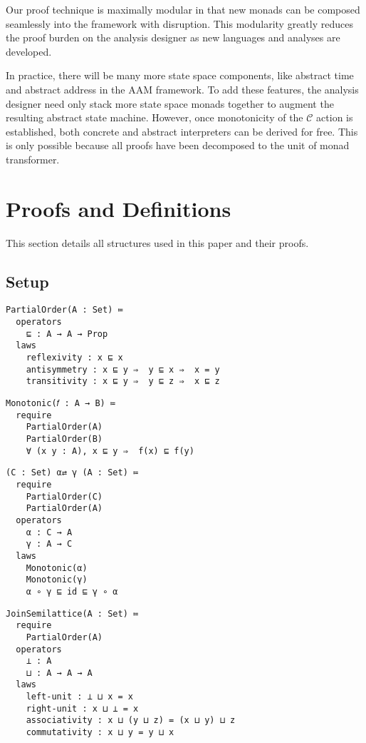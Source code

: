\documentclass{article}
\begin{document}
Our proof technique is maximally modular in that new monads can be composed seamlessly into the framework with disruption.
This modularity greatly reduces the proof burden on the analysis designer as new languages and analyses are developed.

In practice, there will be many more state space components, like abstract time and abstract address in the AAM framework.
To add these features, the analysis designer need only stack more state space monads together to augment the resulting abstract state machine.
However, once monotonicity of the $𝒞$ action is established, both concrete and abstract interpreters can be derived for free.
This is only possible because all proofs have been decomposed to the unit of monad transformer.



\section{Proofs and Definitions}
\label{section:Proofs+Definitions}

This section details all structures used in this paper and their proofs.


\subsection{Setup}
\label{section:Proofs+Definitions:Setup}

\begin{verbatim}
PartialOrder(A : Set) ≔
  operators
    ⊑ : A → A → Prop
  laws
    reflexivity : x ⊑ x
    antisymmetry : x ⊑ y ⇒  y ⊑ x ⇒  x = y
    transitivity : x ⊑ y ⇒  y ⊑ z ⇒  x ⊑ z
\end{verbatim}

\begin{verbatim}
Monotonic(𝑓 : A → B) ≔ 
  require
    PartialOrder(A)
    PartialOrder(B)
    ∀ (x y : A), x ⊑ y ⇒  f(x) ⊑ f(y)
\end{verbatim}

\begin{verbatim}
(C : Set) α⇄ γ (A : Set) ≔
  require
    PartialOrder(C)
    PartialOrder(A)
  operators
    α : C → A
    γ : A → C
  laws
    Monotonic(α)
    Monotonic(γ)
    α ∘ γ ⊑ id ⊑ γ ∘ α
\end{verbatim}

\begin{verbatim}
JoinSemilattice(A : Set) ≔
  require
    PartialOrder(A)
  operators
    ⊥ : A
    ⊔ : A → A → A
  laws
    left-unit : ⊥ ⊔ x = x
    right-unit : x ⊔ ⊥ = x
    associativity : x ⊔ (y ⊔ z) = (x ⊔ y) ⊔ z
    commutativity : x ⊔ y = y ⊔ x
\end{verbatim}
\end{document}
